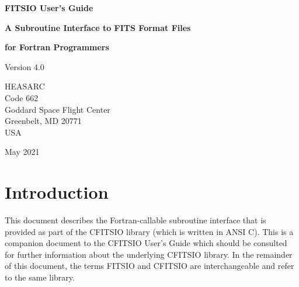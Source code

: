 \documentclass[11pt]{book}
\begin{document}

\begin{titlepage}
\normalsize
\vspace*{4.6cm}
\begin{center}
{\Huge \bf FITSIO User's Guide}\\
\end{center}
\medskip 
\medskip
\begin{center}
{\LARGE \bf A Subroutine Interface to FITS Format Files}\\
\end{center}
\begin{center}
{\LARGE \bf for Fortran Programmers}\\
\end{center}
\medskip
\medskip
\begin{center}
{\Large Version 4.0\\}
\end{center}
\bigskip
\vskip 2.5cm
\begin{center}
{HEASARC\\
Code 662\\
Goddard Space Flight Center\\
Greenbelt, MD 20771\\
USA}
\end{center}

\vfill
\bigskip
\begin{center}
{\Large May 2021\\}
\end{center}
\vfill
\end{titlepage}

\clearpage

\tableofcontents

\chapter{Introduction }

This document describes the Fortran-callable subroutine interface that
is provided as part of the CFITSIO library (which is written in ANSI
C).  This is a companion document to the CFITSIO User's Guide which
should be consulted for further information about the underlying
CFITSIO library.  In the remainder of this document, the terms FITSIO
and CFITSIO are interchangeable and refer to the same library.
\end{document}
